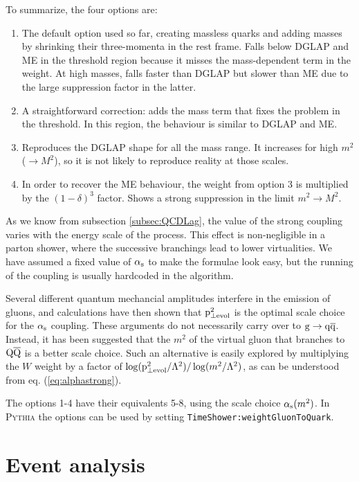 \documentclass[a4paper,12pt]{article}
\begin{document}
\hspace{1em}

To summarize, the four options are:

\begin{enumerate}
\item The default option used so far, creating massless quarks and adding masses by shrinking their three-momenta in the rest frame. Falls below DGLAP and ME in the threshold region because it misses the mass-dependent term in the weight. At high masses, falls faster than DGLAP but slower than ME due to the large suppression factor in the latter.
\item A straightforward correction: adds the mass term that fixes the problem in the threshold. In this region, the behaviour is similar to DGLAP and ME.
\item Reproduces the DGLAP shape for all the mass range. It increases for high $m^2$ ($\to M^2$), so it is not likely to reproduce reality at those scales.
\item In order to recover the ME behaviour, the weight from option 3 is multiplied by the $(1-\delta)^3$ factor. Shows a strong suppression in the limit $m^2\to M^2$.
\end{enumerate}

As we know from subsection \ref{subsec:QCDLag}, the value of the strong coupling varies with the energy scale of the process. This effect is non-negligible in a parton shower, where the successive branchings lead to lower virtualities. We have assumed a fixed value of $\alpha_{\mathrm{s}}$ to make the formulae look easy, but the running of the coupling is usually hardcoded in the algorithm.

Several different quantum mechancial amplitudes interfere in the emission of gluons, and calculations have then shown that ${\mathrm p}^2_{\perp\mathrm{evol}}$ is the optimal scale choice for the $\alpha_{\mathrm{s}}$ coupling. These arguments do not necessarily carry over to ${\mathrm g}\to{\mathrm q}\overline{\mathrm q}$. Instead, it has been suggested that the $m^2$ of the virtual gluon that branches to ${\mathrm Q}\overline{\mathrm Q}$ is a better scale choice. Such an alternative is easily explored by multiplying the $W$ weight by a factor of $\log({\mathrm p}^2_{\perp\mathrm{evol}}/\Lambda^2)/\log(m^2/\Lambda^2)$, as can be understood from eq. (\ref{eq:alphastrong}). 

The options 1-4 have their equivalents 5-8, using the scale choice $\alpha_{\mathrm{s}}(m^2)$. In \textsc{Pythia} the options can be used by setting \verb|TimeShower:weightGluonToQuark|.


\section{Event analysis}
\label{sec:analysis}
\end{document}
